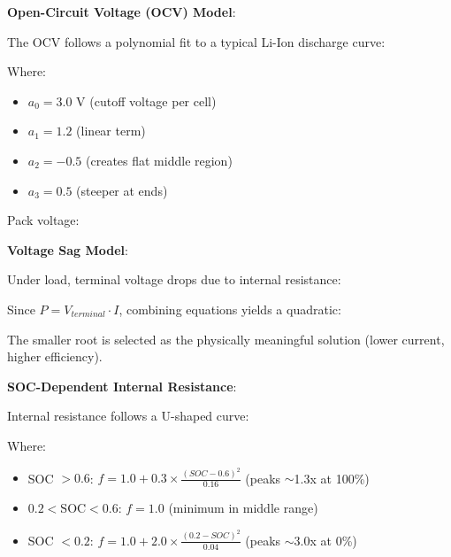 \unclass \textbf{Open-Circuit Voltage (OCV) Model}:

\unclass The OCV follows a polynomial fit to a typical Li-Ion discharge curve:


\unclass Where:
\begin{itemize}
	\item \unclass $a_0 = 3.0$ V (cutoff voltage per cell)
	\item \unclass $a_1 = 1.2$ (linear term)
	\item \unclass $a_2 = -0.5$ (creates flat middle region)
	\item \unclass $a_3 = 0.5$ (steeper at ends)
\end{itemize}

\unclass Pack voltage:


\unclass \textbf{Voltage Sag Model}:

\unclass Under load, terminal voltage drops due to internal resistance:


\unclass Since $P = V_{terminal} \cdot I$, combining equations yields a quadratic:


\unclass The smaller root is selected as the physically meaningful solution (lower current, higher efficiency).

\unclass \textbf{SOC-Dependent Internal Resistance}:

\unclass Internal resistance follows a U-shaped curve:


\unclass Where:
\begin{itemize}
	\item \unclass SOC $> 0.6$: $f = 1.0 + 0.3 \times \frac{(SOC - 0.6)^2}{0.16}$ (peaks $\sim$1.3x at 100\%)
	\item \unclass $0.2 < \text{SOC} < 0.6$: $f = 1.0$ (minimum in middle range)
	\item \unclass SOC $< 0.2$: $f = 1.0 + 2.0 \times \frac{(0.2 - SOC)^2}{0.04}$ (peaks $\sim$3.0x at 0\%)
\end{itemize}

